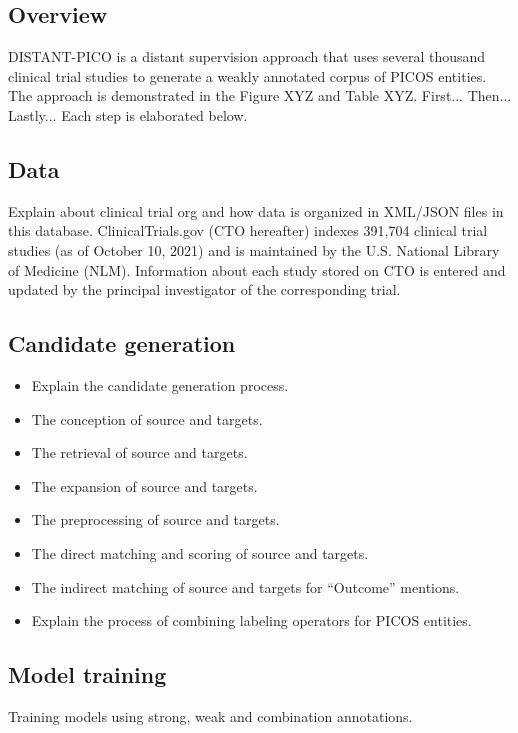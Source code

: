 \documentclass[10.7pt,]{article}
\begin{document}
\subsection{Overview}\label{overview}
%
DISTANT-PICO is a distant supervision approach that uses several thousand clinical trial studies to generate a weakly annotated corpus of PICOS entities.
The approach is demonstrated in the Figure XYZ and Table XYZ.
First...
Then...
Lastly...
Each step is elaborated below.
%
%
%
\subsection{Data}\label{data}
%
Explain about clinical trial org and how data is organized in XML/JSON files in this database.
ClinicalTrials.gov (CTO hereafter) indexes 391,704 clinical trial studies (as of October 10, 2021) and is maintained by the U.S. National Library of Medicine (NLM).
Information about each study stored on CTO is entered and updated by the principal investigator of the corresponding trial.

%
%
%
\subsection{Candidate generation}\label{candgen}

\begin{itemize}
    \item Explain the candidate generation process.
    \item The conception of source and targets.
    \item The retrieval of source and targets.
    \item The expansion of source and targets.
    \item The preprocessing of source and targets.
    \item The direct matching and scoring of source and targets.
    \item The indirect matching of source and targets for ``Outcome'' mentions.
    \item Explain the process of combining labeling operators for PICOS entities.
\end{itemize}
%
%
%
\subsection{Model training}\label{modtrain}
Training models using strong, weak and combination annotations.
%
%
%
\end{document}
